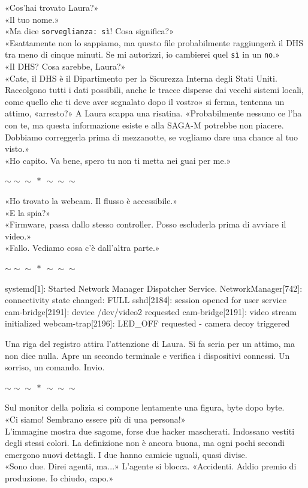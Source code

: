 \documentclass[10pt,oneside]{extbook}
\newcommand{\separatore}{\par
  \begin{center}
    {\Large $\sim\!\!\sim\!\!\sim\ \ast\ \sim\!\!\sim\!\!\sim$}
  \end{center}
  \par
}
\begin{document}
«Cos'hai trovato Laura?»\\
«Il tuo nome.»\\
«Ma dice \texttt{sorveglianza: sì}! Cosa significa?»\\
«Esattamente non lo sappiamo, ma questo file probabilmente raggiungerà il DHS tra meno di cinque minuti. Se mi autorizzi, io cambierei quel \texttt{sì} in un \texttt{no}.»\\
«Il DHS? Cosa sarebbe, Laura?»\\
«Cate, il DHS \`e il Dipartimento per la Sicurezza Interna degli Stati Uniti. Raccolgono tutti i dati possibili, anche le tracce disperse dai vecchi sistemi locali, come quello che ti deve aver segnalato dopo il vostro» si ferma, tentenna un attimo, «arresto?» A Laura scappa una risatina. «Probabilmente nessuno ce l’ha con te, ma questa informazione esiste e alla SAGA-M potrebbe non piacere. Dobbiamo correggerla prima di mezzanotte, se vogliamo dare una chance al tuo visto.»\\
«Ho capito. Va bene, spero tu non ti metta nei guai per me.»\\
\separatore
\par\medskip
«Ho trovato la webcam. Il flusso \`e accessibile.»\\
«E la spia?»\\
«Firmware, passa dallo stesso controller. Posso escluderla prima di avviare il video.»\\
«Fallo. Vediamo cosa c’\`e dall’altra parte.»\\

\separatore
\begin{terminalbox}
 systemd[1]: Started Network Manager Dispatcher Service.
 NetworkManager[742]: connectivity state changed: FULL
 sshd[2184]: session opened for user service
 cam-bridge[2191]: device /dev/video2 requested
 cam-bridge[2191]: video stream initialized
  webcam-trap[2196]: LED_OFF requested - camera decoy triggered
\end{terminalbox}
Una riga del registro attira l'attenzione di Laura.
Si fa seria per un attimo, ma non dice nulla. Apre un secondo terminale e verifica i dispositivi connessi.
Un sorriso, un comando. Invio.
\separatore

Sul monitor della polizia si compone lentamente una figura, byte dopo byte.\\
«Ci siamo! Sembrano essere pi\`u di una persona!»\\
L’immagine mostra due sagome, forse due hacker mascherati. Indossano vestiti degli stessi colori. La definizione non \`e ancora buona, ma ogni pochi secondi emergono nuovi dettagli. I due hanno camicie uguali, quasi divise.\\
«Sono due. Direi agenti, ma...» L’agente si blocca. «Accidenti. Addio premio di produzione. Io chiudo, capo.»\\
\end{document}
